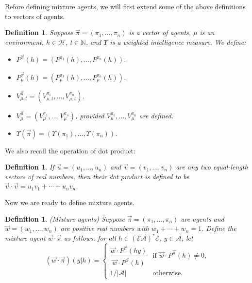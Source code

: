\documentclass[twoside]{article}
\newtheorem{definition}[theorem]{Definition}
\begin{document}
Before defining mixture agents, we will first extend some of the above
definitions to vectors of agents.

\begin{definition}
\label{vectorizationdefn}
    Suppose $\vec\pi=(\pi_1,\ldots,\pi_n)$ is a vector of agents, $\mu$ is an environment,
    $h\in\mathcal H$, $t\in\mathbb N$, and $\Upsilon$ is a weighted
    intelligence measure. We define:
    \begin{itemize}
        \item ${P^{\vec\pi}}(h)=(P^{\pi_1}(h),\ldots,P^{\pi_n}(h))$.
        \item $P^{\vec\pi}_\mu(h)=(P^{\pi_1}_\mu(h),\ldots,P^{\pi_n}_\mu(h))$.
        \item $V^{\vec\pi}_{\mu,t}=(V^{\pi_1}_{\mu,t},\ldots,V^{\pi_n}_{\mu,t})$.
        \item $V^{\vec\pi}_\mu=(V^{\pi_1}_\mu,\ldots,V^{\pi_n}_\mu)$,
            provided $V^{\pi_1}_\mu,\ldots,V^{\pi_n}_\mu$ are defined.
        \item $\Upsilon(\vec\pi)=(\Upsilon(\pi_1),\ldots,\Upsilon(\pi_n))$.
    \end{itemize}
\end{definition}

We also recall the operation of dot product:

\begin{definition}
\label{dotproductdefn}
    If $\vec u=(u_1,\ldots,u_n)$ and
    $\vec v=(v_1,\ldots,v_n)$ are any two equal-length
    vectors of real numbers, then their \emph{dot product}
    is defined to be $\vec u\cdot \vec v=u_1v_1+\cdots+u_nv_n$.
\end{definition}

Now we are ready to define mixture agents.

\begin{definition}
\label{maindefn}
    (Mixture agents)
    Suppose $\vec\pi=(\pi_1,\ldots,\pi_n)$ are agents and $\vec w=(w_1,\ldots,w_n)$
    are positive real numbers with $w_1+\cdots+w_n=1$.
    Define the \emph{mixture agent} $\vec w\cdot\vec\pi$ as follows: for all
    $h\in (\mathcal E\mathcal A)^*\mathcal E$, $y\in\mathcal A$, let
    \[
        (\vec w\cdot\vec\pi)(y|h)
        =
        \begin{cases}
            \dfrac{\vec w\cdot {P^{\vec\pi}}(hy)}{\vec w\cdot {P^{\vec\pi}}(h)}
            &\mbox{if $\vec w\cdot {P^{\vec\pi}}(h)\not=0$,}\\
            1/|\mathcal{A}| &\mbox{otherwise.}
        \end{cases}
    \]
\end{definition}
\end{document}
